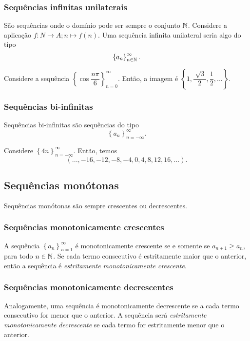       \subsubsection{Sequências infinitas unilaterais}
          São sequências onde o domínio pode ser sempre o conjunto $\mathbb{N}$. 
          Considere a aplicação $f: N \to A; n \mapsto f(n).$ 
          Uma sequência infinita unilateral seria algo do tipo 
          $$\left\{a_{n}\right\}^{\infty}_{n \in \mathbb{N}}.$$
         \begin{exmp}
            Considere a sequência $\left\{\cos{\dfrac{n\pi}{6}}\right\}
            ^{\infty}_{n=0}$. Então, a imagem é $\left\{1,
            \dfrac{\sqrt[]{3}}{2}, \dfrac{1}{2}, ...\right\}.$
         \end{exmp}
      
      \subsubsection{Sequências bi-infinitas}
         Sequências bi-infinitas são sequências do tipo 
         $$\left\{a_{n}\right\}^{\infty}_{n=-\infty}.$$
         \begin{exmp}
            Considere $\left\{4n\right\}^{\infty}_{n=-\infty}$. 
            Então, temos $$(..., -16,-12,-8,-4,0,4,8,12,16,...).$$
         \end{exmp}
   \subsection{Sequências monótonas}
      Sequências monótonas são sempre crescentes ou decrescentes. 
         \subsubsection{Sequências monotonicamente crescentes}
               A sequência $\left\{a_{n}\right\}^{\infty}_{n=1}$ 
               é monotonicamente crescente se e somente se 
               $a_{n+1} \geq a_{n}$, para todo $n \in \mathbb{N}$. 
               Se cada termo consecutivo é estritamente maior que o 
               anterior, então a sequência é \emph{estritamente 
               monotonicamente crescente}.
            \subsubsection{Sequências monotonicamente decrescentes}
               Analogamente, uma sequência é monotonicamente decrescente 
               se a cada termo consecutivo for menor que o anterior. 
               A sequência será \emph{estritamente monotonicamente 
               decrescente} se cada termo for estritamente menor que o anterior.
      
